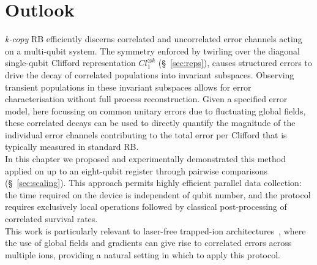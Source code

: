 \section{Outlook}
\label{sec:outlook}
\emph{k-copy} RB efficiently discerns correlated and uncorrelated error channels
acting on a multi-qubit system. The symmetry enforced by
twirling over the diagonal single-qubit Clifford representation $Cl_1^{\otimes k}$
(\S~\ref{sec:reps}), causes structured errors to drive the decay of
correlated populations into invariant subspaces. Observing transient populations in these invariant subspaces allows for error characterisation without full process reconstruction. Given a specified error
model, here focussing on common unitary errors due to fluctuating global fields, these correlated decays can be used to directly quantify the
magnitude of the individual error channels contributing to the total error
per Clifford that is typically measured in standard RB.\\

In this chapter we proposed and experimentally demonstrated this method applied on up to an eight-qubit register through pairwise
comparisons (\S~\ref{sec:scaling}). This approach permits highly
efficient parallel data collection: the time required on the device is
independent of qubit number, and the protocol requires exclusively local
operations followed by classical post-processing of correlated survival
rates.\\

This work is particularly relevant to laser-free trapped-ion
architectures~\cite{loschnauer_scalable_2025, hughes_trapped-ion_2025}, where
the use of global fields and gradients can give rise to correlated errors across
multiple ions, providing a natural setting in which to apply this protocol.

